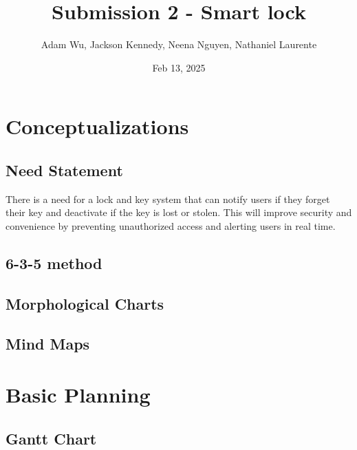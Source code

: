 \documentclass{article}
\title{Submission 2 - Smart lock} %
\author{Adam Wu, Jackson Kennedy, Neena Nguyen, Nathaniel Laurente}
\date{Feb 13, 2025}
\begin{document}
\maketitle

\tableofcontents
\newpage

\section{Conceptualizations}
\subsection{Need Statement}
There is a need for a lock and key system that can notify users if they forget their key and deactivate if the key is lost or stolen. This will improve security and convenience by preventing unauthorized access and alerting users in real time.


\subsection{6-3-5 method}

\subsection{Morphological Charts}

\subsection{Mind Maps}



\section{Basic Planning}
\subsection{Gantt Chart}
\end{document}
